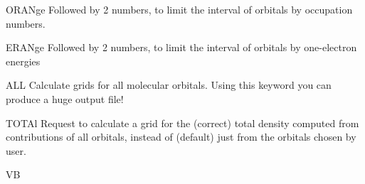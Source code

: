 \begin{keywordlist}
\item[ORANge]
Followed by 2 numbers, to limit the interval of
orbitals by occupation numbers.
\item[ERANge]
Followed by 2 numbers, to limit the interval of
orbitals by one-electron energies
\item[ALL]
Calculate grids for all molecular orbitals. Using this keyword you can produce a
huge output file!
\item[TOTAl]
Request to calculate a grid for the (correct) total
density computed from contributions of all orbitals, instead of (default)
just from the orbitals chosen by user.
\item[VB]

\end{keywordlist}
